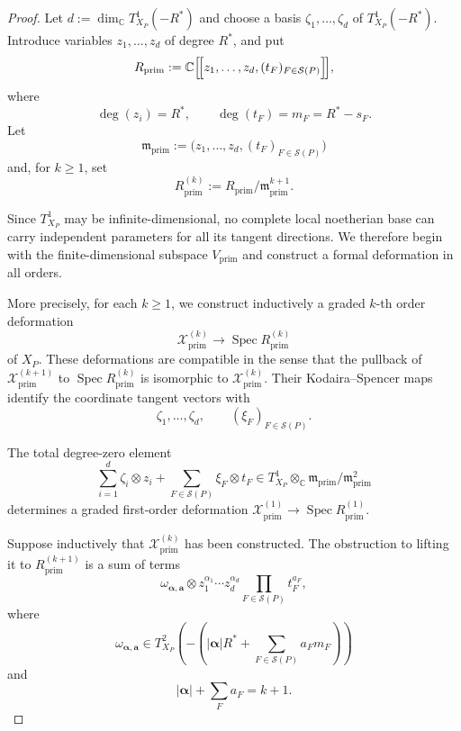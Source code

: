 \documentclass[11pt]{amsart}
\numberwithin{equation}{section}
\theoremstyle{plain}
\theoremstyle{definition}
\newcommand{\0}{$0$-mutable}
\newcommand{\CC}{\ensuremath{\mathbb{C}}}
\renewcommand{\1}{$1$-rigid}
\renewcommand{\0}{$0$-mutable}
\begin{document}
\begin{proof}

Let
$
d:=\dim_{\CC}T^1_{X_P}(-R^*)
$
and choose a basis
$
\zeta_1,\ldots,\zeta_d
$
of \(T^1_{X_P}(-R^*)\). Introduce variables
$
z_1,\ldots,z_d
$
of degree \(R^*\), and put
\[
R_{\mathrm{prim}}
:=
\CC\Bigl[\!\Bigl[
z_1,\ldots,z_d,
(t_F)_{F\in\mathcal S(P)}
\Bigr]\!\Bigr],
\]
where
\[
\deg(z_i)=R^*,
\qquad
\deg(t_F)=m_F=R^*-s_F.
\]
Let
\[
\mathfrak m_{\mathrm{prim}}
:=
\bigl(z_1,\ldots,z_d,(t_F)_{F\in\mathcal S(P)}\bigr)
\]
and, for \(k\geq1\), set
\[
R_{\mathrm{prim}}^{(k)}
:=
R_{\mathrm{prim}}/
\mathfrak m_{\mathrm{prim}}^{k+1}.
\]


Since \(T^1_{X_P}\) may be infinite-dimensional, no complete local
noetherian base can carry independent parameters for all its tangent
directions. We therefore begin with the finite-dimensional subspace
\(V_{\mathrm{prim}}\) and construct a formal deformation in all orders.

More precisely, for each \(k\geq1\), we construct inductively a graded
\(k\)-th order deformation
\[
\mathcal X_{\mathrm{prim}}^{(k)}
\longrightarrow
\operatorname{Spec}R_{\mathrm{prim}}^{(k)}
\]
of \(X_P\). These deformations are compatible in the sense that the
pullback of \(\mathcal X_{\mathrm{prim}}^{(k+1)}\) to
\(\operatorname{Spec}R_{\mathrm{prim}}^{(k)}\) is isomorphic to
\(\mathcal X_{\mathrm{prim}}^{(k)}\). Their Kodaira--Spencer maps
identify the coordinate tangent vectors with
\[
\zeta_1,\ldots,\zeta_d,
\qquad
(\xi_F)_{F\in\mathcal S(P)}.
\]

The total degree-zero element
\[
\sum_{i=1}^d\zeta_i\otimes z_i
+
\sum_{F\in\mathcal S(P)}\xi_F\otimes t_F
\in
T^1_{X_P}\otimes_{\CC}
\mathfrak m_{\mathrm{prim}}/
\mathfrak m_{\mathrm{prim}}^2
\]
determines a graded first-order deformation
$
\mathcal X_{\mathrm{prim}}^{(1)}
\longrightarrow
\operatorname{Spec}R_{\mathrm{prim}}^{(1)}.
$

Suppose inductively that
\(\mathcal X_{\mathrm{prim}}^{(k)}\) has been constructed.
The obstruction
to lifting it to \(R_{\mathrm{prim}}^{(k+1)}\) is a sum of terms
\[
\omega_{\boldsymbol\alpha,\mathbf a}
\otimes
z_1^{\alpha_1}\cdots z_d^{\alpha_d}
\prod_{F\in\mathcal S(P)}t_F^{a_F},
\]
where
\[
\omega_{\boldsymbol\alpha,\mathbf a}
\in
T^2_{X_P}\left(
-
\left(
|\boldsymbol\alpha|R^*
+
\sum_{F\in\mathcal S(P)}a_Fm_F
\right)
\right)
\]
and
\[
|\boldsymbol\alpha|
+
\sum_Fa_F
=
k+1.
\]


\end{proof}
\end{document}
